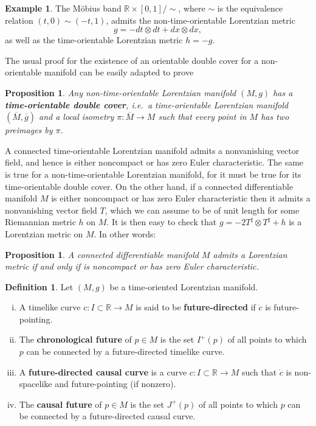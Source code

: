 \documentclass[10pt]{amsart}
\newcommand{\bbR}{\mathbb{R}}      %
\newtheorem{Prop}[Thm]{Proposition}
\theoremstyle{definition}
\newtheorem{Def}[Thm]{Definition}
\newtheorem{Example}[Thm]{Example}
\theoremstyle{remark}
\begin{document}
\begin{Example}
The M\"obius band $\bbR \times [0,1] / \sim$, where $\sim$ is the equivalence relation $(t,0) \sim (-t, 1)$, admits the non-time-orientable Lorentzian metric
\[
g = - dt \otimes dt + dx \otimes dx,
\]
as well as the time-orientable Lorentzian metric $h=-g$.
\end{Example}

The usual proof for the existence of an orientable double cover for a non-orientable manifold can be easily adapted to prove

\begin{Prop}
Any non-time-orientable Lorentzian manifold $(M,g)$ has a {\bf time-orientable double cover}, i.e.~a time-orientable Lorentzian manifold $(\overline{M},\overline{g})$ and a local isometry $\pi:\overline{M}\to M$ such that every point in $M$ has two preimages by $\pi$.
\end{Prop}

A connected time-orientable Lorentzian manifold admits a nonvanishing vector field, and hence is either noncompact or has zero Euler characteristic. The same is true for a non-time-orientable Lorentzian manifold, for it must be true for its time-orientable double cover. On the other hand, if a connected differentiable manifold $M$ is either noncompact or has zero Euler characteristic then it admits a nonvanishing vector field $T$, which we can assume to be of unit length for some Riemannian metric $h$ on $M$. It is then easy to check that  $g = -2 T^\sharp \otimes T^\sharp + h$ is a Lorentzian metric on $M$. In other words:

\begin{Prop}
A connected differentiable manifold $M$ admits a Lorentzian metric if and only if is noncompact or has zero Euler characteristic.
\end{Prop}

\begin{Def}
Let $(M,g)$ be a time-oriented Lorentzian manifold.
\begin{enumerate}[(i)]
\item
A timelike curve $c:I \subset \bbR \to M$ is said to be {\bf future-directed} if $\dot{c}$ is future-pointing.
\item
The {\bf chronological future} of $p\in M$ is the set $I^+(p)$ of all points to which $p$ can be connected by a future-directed timelike curve.
\item
A {\bf future-directed causal curve} is a curve $c:I \subset \bbR \to M$ such that $\dot{c}$ is non-spacelike and future-pointing (if nonzero).
\item
The {\bf causal future} of $p\in M$ is the set $J^+(p)$ of all points to which $p$ can be connected by a future-directed causal curve.
\end{enumerate}
\end{Def}
\end{document}
